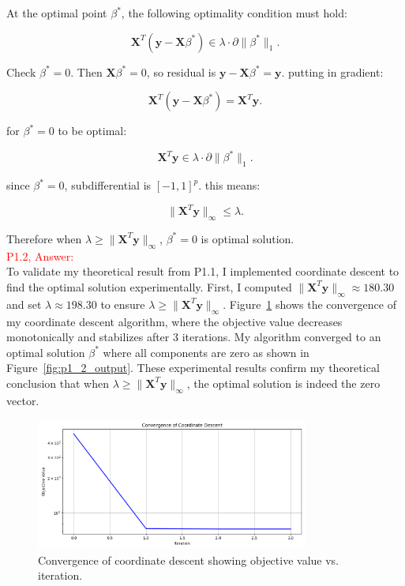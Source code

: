 \documentclass[11pt]{article}
\newcommand{\mtx}[1]{\mathbf{#1}}
\newcommand{\vct}[1]{\mathbf{#1}}
\def \mX {\mtx{X}}
\def \vy {\vct{y}}
\def \mX {\mtx{X}}
\begin{document}
At the optimal point \(\beta^*\), the following optimality condition must hold:

\[
\mX^T (\vy - \mX\beta^*) \in \lambda \cdot \partial \|\beta^*\|_1.
\]

Check \(\beta^* = 0\). Then \(\mX\beta^* = 0\), so residual is \(\vy - \mX\beta^* = \vy\). putting in gradient:

\[
\mX^T (\vy - \mX\beta^*) = \mX^T \vy.
\]

for \(\beta^* = 0\) to be optimal:

\[
\mX^T \vy \in \lambda \cdot \partial \|\beta^*\|_1.
\]

since \(\beta^* = 0\), subdifferential is \([-1, 1]^p\). this means:

\[
\|\mX^T \vy\|_\infty \leq \lambda.
\]

Therefore when \(\lambda \geq \|\mX^T \vy\|_\infty\), \(\beta^* = 0\) is optimal solution.\\


\textcolor{red}{P1.2, Answer:}\\

To validate my theoretical result from P1.1, I implemented coordinate descent to find the optimal solution experimentally. 
First, I computed $\|\mX^T\vy\|_\infty \approx 180.30$ and set $\lambda \approx 198.30$ to ensure $\lambda \geq \|\mX^T\vy\|_\infty$. 
Figure~\ref{fig:p1_2_descent} shows the convergence of my coordinate descent algorithm, where the objective value decreases monotonically 
and stabilizes after 3 iterations. My algorithm converged to an optimal solution $\beta^*$ where all components are zero as shown in Figure~\ref{fig:p1_2_output}. 
These experimental results confirm my theoretical conclusion that when $\lambda \geq \|\mX^T\vy\|_\infty$, the optimal solution is indeed the zero vector.\\

\begin{figure}[h]
\centering
\includegraphics[width=0.8\textwidth]{p1_2_descent.png}
\caption{Convergence of coordinate descent showing objective value vs. iteration.}
\label{fig:p1_2_descent}
\end{figure}
\end{document}
